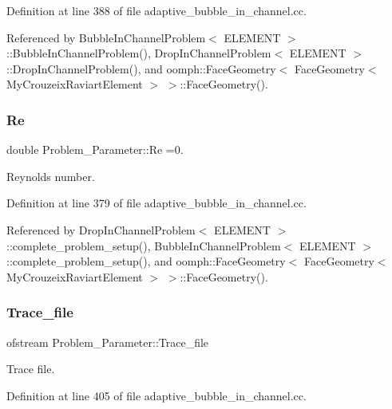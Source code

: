 Definition at line 388 of file adaptive\+\_\+bubble\+\_\+in\+\_\+channel.\+cc.



Referenced by Bubble\+In\+Channel\+Problem$<$ E\+L\+E\+M\+E\+N\+T $>$\+::\+Bubble\+In\+Channel\+Problem(), Drop\+In\+Channel\+Problem$<$ E\+L\+E\+M\+E\+N\+T $>$\+::\+Drop\+In\+Channel\+Problem(), and oomph\+::\+Face\+Geometry$<$ Face\+Geometry$<$ My\+Crouzeix\+Raviart\+Element $>$ $>$\+::\+Face\+Geometry().

\mbox{\label{namespaceProblem__Parameter_acc656299287d4d9a8374c2c501750b4f}} 
\subsubsection{\texorpdfstring{Re}{Re}}
{\footnotesize\ttfamily double Problem\+\_\+\+Parameter\+::\+Re =0.}



Reynolds number. 



Definition at line 379 of file adaptive\+\_\+bubble\+\_\+in\+\_\+channel.\+cc.



Referenced by Drop\+In\+Channel\+Problem$<$ E\+L\+E\+M\+E\+N\+T $>$\+::complete\+\_\+problem\+\_\+setup(), Bubble\+In\+Channel\+Problem$<$ E\+L\+E\+M\+E\+N\+T $>$\+::complete\+\_\+problem\+\_\+setup(), and oomph\+::\+Face\+Geometry$<$ Face\+Geometry$<$ My\+Crouzeix\+Raviart\+Element $>$ $>$\+::\+Face\+Geometry().

\mbox{\label{namespaceProblem__Parameter_a55310be5f2dfcb5fcfe35d71f9c16e06}} 
\subsubsection{\texorpdfstring{Trace\+\_\+file}{Trace\_file}}
{\footnotesize\ttfamily ofstream Problem\+\_\+\+Parameter\+::\+Trace\+\_\+file}



Trace file. 



Definition at line 405 of file adaptive\+\_\+bubble\+\_\+in\+\_\+channel.\+cc.



